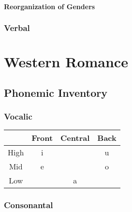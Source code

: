 \documentclass{report}
\begin{document}
\subsubsection{Reorganization of Genders}

\subsection{Verbal}

\chapter{Western Romance}


\section{Phonemic Inventory}

\subsection{Vocalic}

\begin{tcolorbox}[title=Western Romance Monophthongs, hbox]
  \begin{tabular}{|c|c|c|c|}
    \hline
    & Front & Central & Back \\
    \hline
    High & i & & u \\
    \hline
    Mid & e & & o \\
    \hline
    Low & & a & \\
    \hline
  \end{tabular}
\end{tcolorbox}

\subsection{Consonantal}
\end{document}
